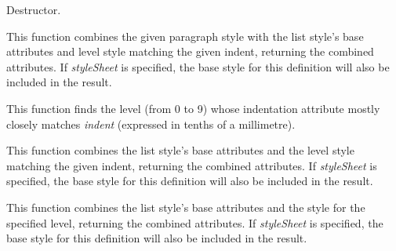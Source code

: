 
Destructor.

\label{wxrichtextliststyledefinitioncombinewithparagraphstyle}


This function combines the given paragraph style with the list style's base attributes and level style matching the given indent, returning the combined attributes.
If {\it styleSheet} is specified, the base style for this definition will also be included in the result.

\label{wxrichtextliststyledefinitionfindlevelforindent}


This function finds the level (from 0 to 9) whose indentation attribute mostly closely matches {\it indent} (expressed in tenths of a millimetre).

\label{wxrichtextliststyledefinitiongetcombinedstyle}


This function combines the list style's base attributes and the level style matching the given indent, returning the combined attributes.
If {\it styleSheet} is specified, the base style for this definition will also be included in the result.

\label{wxrichtextliststyledefinitioncombinewithparagraphstyleforlevel}


This function combines the list style's base attributes and the style for the specified level, returning the combined attributes.
If {\it styleSheet} is specified, the base style for this definition will also be included in the result.

\label{wxrichtextliststyledefinitiongetlevelattributes}

